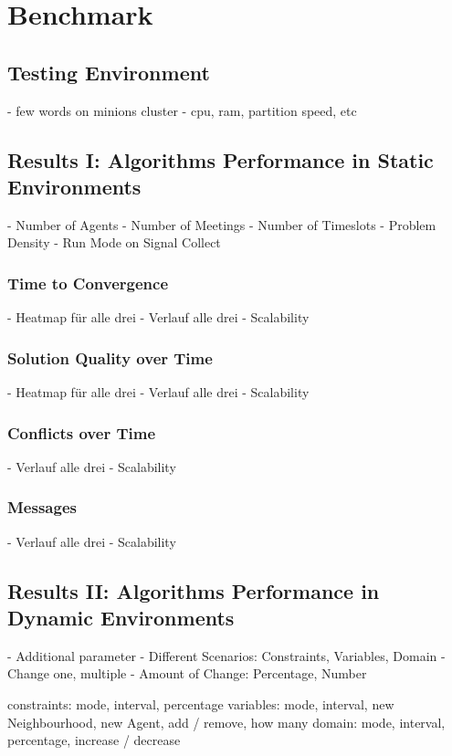 \chapter{Benchmark}

\section{Testing Environment}

- few words on minions cluster
- cpu, ram, partition speed, etc

\section{Results I: Algorithms Performance in Static Environments}

- Number of Agents
- Number of Meetings
- Number of Timeslots
- Problem Density
- Run Mode on Signal Collect

\subsection{Time to Convergence}
- Heatmap für alle drei
- Verlauf alle drei
- Scalability
\subsection{Solution Quality over Time}
- Heatmap für alle drei
- Verlauf alle drei
- Scalability
\subsection{Conflicts over Time}
- Verlauf alle drei
- Scalability
\subsection{Messages}
-  Verlauf alle drei
- Scalability

\section{Results II: Algorithms Performance in Dynamic Environments}

- Additional parameter
- Different Scenarios: Constraints, Variables, Domain
- Change one, multiple
- Amount of Change: Percentage, Number

constraints: mode, interval, percentage
variables: mode, interval, new Neighbourhood, new Agent, add / remove, how many
domain: mode, interval, percentage, increase / decrease

